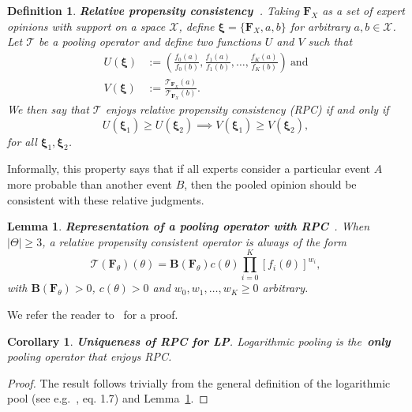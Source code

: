 \documentclass[a4paper, notitlepage, 10pt]{article}
\newtheorem{definition}{Definition}[]
\newtheorem{lemma}{Lemma}[]
\newtheorem{corollary}{Corollary}[]
\begin{document}
\begin{definition}
\label{def:RPC}
\textbf{Relative propensity consistency~\citep{genest1984}}.
Taking $\boldsymbol F_{X}$ as a set of expert opinions with support on a space $\mathcal{X}$, define $\boldsymbol \xi = \{\boldsymbol F_{X}, a, b\}$ for arbitrary $a , b \in \mathcal{X}$.
Let $\mathcal{T}$ be a pooling operator and define two functions $U$ and $V$ such that 
\begin{align}
 U(\boldsymbol \xi) &:= \left( \frac{f_0(a)}{f_0(b)}, \frac{f_1(a)}{f_1(b)}, \ldots, \frac{f_K(a)}{f_K(b)} \right)\:\text{and}\\
 V(\boldsymbol \xi) & := \frac{\mathcal{T}_{\boldsymbol F_{X}} (a)}{\mathcal{T}_{\boldsymbol F_{X}} (b)}.
\end{align}
We then say that $\mathcal{T}$ enjoys \textit{relative propensity consistency} (RPC) if and only if
\begin{equation}
 U(\boldsymbol \xi_1) \geq U(\boldsymbol \xi_2) \implies  V(\boldsymbol \xi_1) \geq V(\boldsymbol \xi_2),
\end{equation}
for all $\boldsymbol \xi_1, \boldsymbol \xi_2$.
\end{definition}
Informally, this property says that if all experts consider a particular event $A$ more probable than another event $B$, then the pooled opinion should be consistent with these relative judgments. 

\begin{lemma}
\label{lem:RPC_representation}
\textbf{Representation of a pooling operator with RPC}~\citep[eq. 1.4]{genest1984}.
When $|\Theta| \geq 3$, a relative propensity consistent operator is always of the form
\[ \mathcal{T} \left( \boldsymbol F_\theta \right)(\theta) = \boldsymbol B\left( \boldsymbol F_\theta \right) c(\theta) \prod_{i=0}^K \left[f_i(\theta) \right]^{w_i},\]
with $\boldsymbol B\left( \boldsymbol F_\theta \right) > 0$, $c(\theta) >0$  and $w_0, w_1, \ldots, w_K \geq 0$ arbitrary.
\end{lemma}
We refer the reader to~\cite{genest1984} for a proof.

\begin{corollary}
\label{cor:uniqueness_LP}
\textbf{Uniqueness of RPC for LP}.
Logarithmic pooling is the~\textbf{only} pooling operator that enjoys RPC.
\end{corollary}
\begin{proof}
The result follows trivially from the general definition of the logarithmic pool (see e.g.~\cite{genest1986B}, eq. 1.7) and Lemma~\ref{lem:RPC_representation}.
\end{proof}
\end{document}
